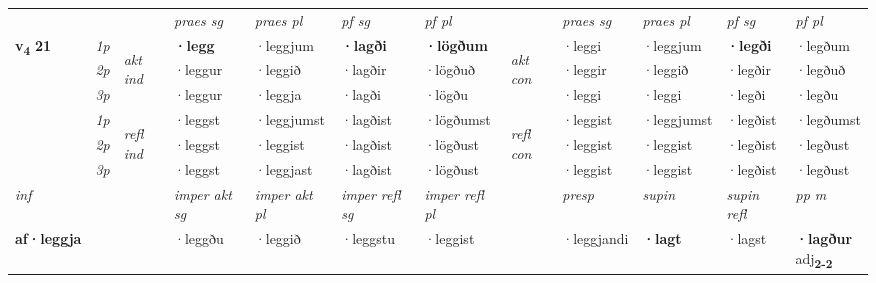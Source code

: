 \begin{longtable}[l]{X>{\footnotesize\itshape}llXXXXlXXXX}
\midrule

 & &   & \textit{praes sg}  & \textit{praes pl}    & \textit{ pf sg} & \textit{pf pl} & & \textit{praes sg}  & \textit{praes pl}    & \textit{pf sg} & \textit{pf pl }  \\ \cmidrule{4-7} \cmidrule{9-12}
 \multirow{2}{*}{{{\textbf{v{\textsubscript{4}}} \Large{\textbf{21}}}}}  & 1p & \multirow{3}{*}{\begin{turn}{90}\textit{akt ind}\end{turn}} & \textbf{·legg} & ·leggjum & \textbf{·lagði} & \textbf{·lögðum} & \multirow{3}{*}{\begin{turn}{90}\textit{akt con}\end{turn}} &·leggi & ·leggjum & \textbf{·legði} & ·legðum\\*
 & 2p &  &  ·leggur  & ·leggið & ·lagðir & ·lögðuð & & ·leggir & ·leggið & ·legðir & ·legðuð \\*
 & 3p &  & ·leggur & ·leggja & ·lagði & ·lögðu & & ·leggi & ·leggi& ·legði & ·legðu \\*
\cmidrule{4-7} \cmidrule{9-12}
 & 1p & \multirow{3}{*}{\begin{turn}{90}\textit{refl ind}\end{turn}}  & ·leggst & ·leggjumst & ·lagðist & ·lögðumst & \multirow{3}{*}{\begin{turn}{90}\textit{refl con}\end{turn}}  &·leggist & ·leggjumst & ·legðist & ·legðumst \\*
 & 2p &  & ·leggst & ·leggist & ·lagðist & ·lögðust & &·leggist & ·leggist & ·legðist & ·legðust \\*
 & 3p  & & ·leggst & ·leggjast & ·lagðist & ·lögðust & & ·leggist & ·leggist& ·legðist & ·legðust \\*
\cmidrule{4-7} \cmidrule{9-12}

   {\textit{inf}} & &  & \textit{imper akt sg} & \textit{imper akt pl} & \textit{imper refl sg} & \textit{imper refl pl} && \textit{presp} & \textit{supin} & \textit{supin refl} & \textit{pp m} \\*
  {\textbf{af\allowbreak ·leggja}} & && ·leggðu  & ·leggið & ·leggstu & ·leggist && ·leggjandi &  \textbf{·lagt} & ·lagst & \specialcell{\textbf{·lagður} \\ adj\textbf{\textsubscript{2-2}}} \\*

\midrule


\end{longtable}

